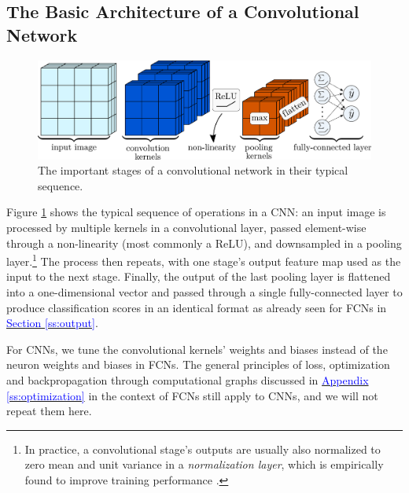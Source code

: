 \documentclass[11pt, a4paper]{article}
\newcommand{\myhref}[2]{\hyperref[#1]{\textcolor{blue}{#2}}}
\begin{document}

\subsection{The Basic Architecture of a Convolutional Network} \label{ss:cnn-architecture}

\begin{figure}[htb!]
    \centering
    \includegraphics[width=0.95\linewidth]{vector/cnn-architecture.pdf}
    \caption{The important stages of a convolutional network in their typical sequence.}
    \label{fig:cnn-architecture}
\end{figure}

Figure \ref{fig:cnn-architecture} shows the typical sequence of operations in a CNN: an input image is processed by multiple kernels in a convolutional layer, passed element-wise through a non-linearity (most commonly a ReLU), and downsampled in a pooling layer.\footnote{In practice, a convolutional stage's outputs are usually also normalized to zero mean and unit variance in a \textit{normalization layer}, which is empirically found to improve training performance \cite{homl}.} The process then repeats, with one stage's output feature map used as the input to the next stage. Finally, the output of the last pooling layer is flattened into a one-dimensional vector and passed through a single fully-connected layer to produce classification scores in an identical format as already seen for FCNs in \myhref{ss:output}{Section \ref{ss:output}}.

For CNNs, we tune the convolutional kernels' weights and biases instead of the neuron weights and biases in FCNs. The general principles of loss, optimization and backpropagation through computational graphs discussed in \myhref{ss:optimization}{Appendix \ref{ss:optimization}} in the context of FCNs still apply to CNNs, and we will not repeat them here.

\end{document}

